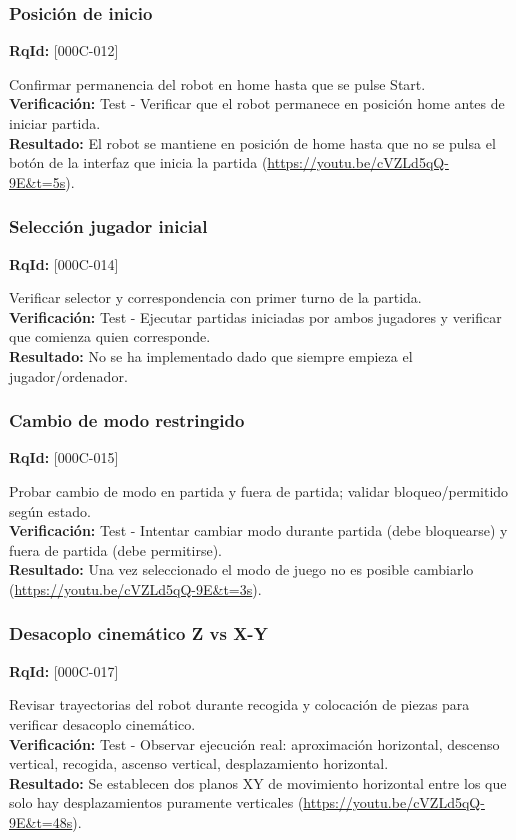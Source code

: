 \documentclass[12pt,a4paper]{article}
\begin{document}
\subsubsection{Posición de inicio}
\textbf{RqId:} [000C-012]
\vspace{0.3em}
\par Confirmar permanencia del robot en home hasta que se pulse Start.
\\ \textbf{Verificación:} Test - Verificar que el robot permanece en posición home antes de iniciar partida.
\\ \textbf{Resultado:} El robot se mantiene en posición de home hasta que no se pulsa el botón de la interfaz que inicia la partida (\url{https://youtu.be/cVZLd5qQ-9E&t=5s}).

\subsubsection{Selección jugador inicial}
\textbf{RqId:} [000C-014]
\vspace{0.3em}
\par Verificar selector y correspondencia con primer turno de la partida.
\\ \textbf{Verificación:} Test - Ejecutar partidas iniciadas por ambos jugadores y verificar que comienza quien corresponde.
\\ \textbf{Resultado:} No se ha implementado dado que siempre empieza el jugador/ordenador.

\subsubsection{Cambio de modo restringido}
\textbf{RqId:} [000C-015]
\vspace{0.3em}
\par Probar cambio de modo en partida y fuera de partida; validar bloqueo/permitido según estado.
\\ \textbf{Verificación:} Test - Intentar cambiar modo durante partida (debe bloquearse) y fuera de partida (debe permitirse).
\\ \textbf{Resultado:} Una vez seleccionado el modo de juego no es posible cambiarlo (\url{https://youtu.be/cVZLd5qQ-9E&t=3s}).

\subsubsection{Desacoplo cinemático Z vs X-Y}
\textbf{RqId:} [000C-017]
\vspace{0.3em}
\par Revisar trayectorias del robot durante recogida y colocación de piezas para verificar desacoplo cinemático.
\\ \textbf{Verificación:} Test - Observar ejecución real: aproximación horizontal, descenso vertical, recogida, ascenso vertical, desplazamiento horizontal.
\\ \textbf{Resultado:} Se establecen dos planos XY de movimiento horizontal entre los que solo hay desplazamientos puramente verticales (\url{https://youtu.be/cVZLd5qQ-9E&t=48s}).
\end{document}
